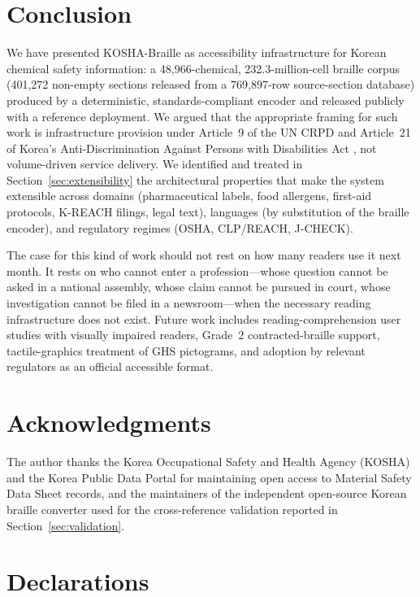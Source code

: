 \documentclass[journal]{IEEEtran}
\begin{document}
\section{Conclusion}
\label{sec:conclusion}

We have presented KOSHA-Braille as accessibility infrastructure for Korean chemical safety information: a 48{,}966-chemical, 232.3-million-cell braille corpus (401{,}272 non-empty sections released from a 769{,}897-row source-section database) produced by a deterministic, standards-compliant encoder and released publicly with a reference deployment. We argued that the appropriate framing for such work is infrastructure provision under Article~9 of the UN CRPD \cite{crpd} and Article~21 of Korea's Anti-Discrimination Against Persons with Disabilities Act \cite{kdpa}, not volume-driven service delivery. We identified and treated in Section~\ref{sec:extensibility} the architectural properties that make the system extensible across domains (pharmaceutical labels, food allergens, first-aid protocols, K-REACH filings, legal text), languages (by substitution of the braille encoder), and regulatory regimes (OSHA, CLP/REACH, J-CHECK).

The case for this kind of work should not rest on how many readers use it next month. It rests on who cannot enter a profession---whose question cannot be asked in a national assembly, whose claim cannot be pursued in court, whose investigation cannot be filed in a newsroom---when the necessary reading infrastructure does not exist. Future work includes reading-comprehension user studies with visually impaired readers, Grade~2 contracted-braille support, tactile-graphics treatment of GHS pictograms, and adoption by relevant regulators as an official accessible format.

\section*{Acknowledgments}

The author thanks the Korea Occupational Safety and Health Agency (KOSHA) and the Korea Public Data Portal for maintaining open access to Material Safety Data Sheet records, and the maintainers of the independent open-source Korean braille converter \cite{hangul_braille_converter} used for the cross-reference validation reported in Section~\ref{sec:validation}.

\section*{Declarations}
\end{document}
